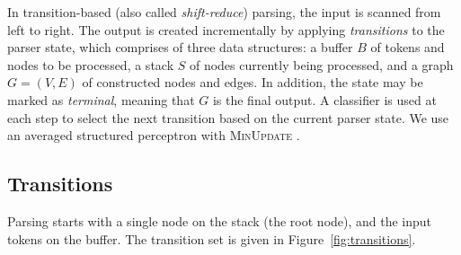 \documentclass[11pt]{article}
\newcommand{\figref}[1]{Figure~\ref{#1}}
\begin{document}
In transition-based (also called \textit{shift-reduce}) parsing, the input is scanned from left to right. The output is created incrementally by applying \textit{transitions} to the parser state, which comprises of three data structures: a buffer $B$ of tokens and nodes to be processed, a stack $S$ of nodes currently being processed, and a graph $G=(V,E)$ of constructed nodes and edges. In addition, the state may be marked as \textit{terminal}, meaning that $G$ is the final output. A classifier is used at each step to select the next transition based on the current parser state. We use an averaged structured perceptron \cite{Coll:04} with \textsc{MinUpdate} \cite{cai2011language}.

\subsection{Transitions}

Parsing starts with a single node on the stack (the root node), and the input tokens on the buffer.
The transition set is given in \figref{fig:transitions}.
\end{document}
